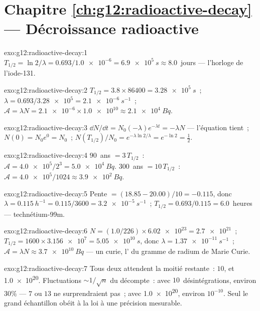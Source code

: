 \section*{Chapitre \ref{ch:g12:radioactive-decay} --- Décroissance radioactive}

\begin{solution}{exo:g12:radioactive-decay:1}
$T_{1/2} = \ln 2/\lambda = 0.693/\num{1.0e-6} = \qty{6.9e5}{s}
\approx 8.0$~jours --- l'horloge de l'iode-131.
\end{solution}

\begin{solution}{exo:g12:radioactive-decay:2}
$T_{1/2} = 3.8 \times \num{86400} = \qty{3.28e5}{s}$~;
$\lambda = 0.693/\num{3.28e5} = \qty{2.1e-6}{s^{-1}}$~;
$\mathcal A = \lambda N = \num{2.1e-6} \times \num{1.0e10} \approx
\qty{2.1e4}{Bq}$.
\end{solution}

\begin{solution}{exo:g12:radioactive-decay:3}
$\dd N/\dd t = N_0(-\lambda)e^{-\lambda t} = -\lambda N$ ---
l'équation tient~; $N(0) = N_0 e^0 = N_0$~;
$N(T_{1/2})/N_0 = e^{-\lambda \ln 2/\lambda} = e^{-\ln 2} =
\tfrac12$.
\end{solution}

\begin{solution}{exo:g12:radioactive-decay:4}
$90$~ans $= 3\,T_{1/2}$~: $\mathcal A = \num{4.0e5}/2^3 =
\qty{5.0e4}{Bq}$. $300$~ans $= 10\,T_{1/2}$~:
$\mathcal A = \num{4.0e5}/1024 \approx \qty{3.9e2}{Bq}$.
\end{solution}

\begin{solution}{exo:g12:radioactive-decay:5}
Pente $= (18.85 - 20.00)/10 = -0.115$, donc
$\lambda = \qty{0.115}{h^{-1}} = 0.115/3600 = \qty{3.2e-5}{s^{-1}}$~;
$T_{1/2} = 0.693/0.115 = 6.0$~heures --- technétium-99m.
\end{solution}

\begin{solution}{exo:g12:radioactive-decay:6}
$N = (1.0/226) \times \num{6.02e23} = \num{2.7e21}$~;
$T_{1/2} = 1600 \times \num{3.156e7} = \qty{5.05e10}{s}$, donc
$\lambda = \qty{1.37e-11}{s^{-1}}$~;
$\mathcal A = \lambda N \approx \qty{3.7e10}{Bq}$ --- un curie,
l' du gramme de radium de Marie Curie.
\end{solution}

\begin{solution}{exo:g12:radioactive-decay:7}
Tous deux attendent la moitié restante~: $10$, et \num{1.0e20}.
Fluctuations $\sim 1/\sqrt{n}$ du décompte~: avec $10$~désintégrations,
environ $30\%$ --- $7$ ou $13$ ne surprendraient pas~; avec
\num{1.0e20}, environ $10^{-10}$. Seul le grand échantillon obéit à
la loi à une précision mesurable.
\end{solution}

